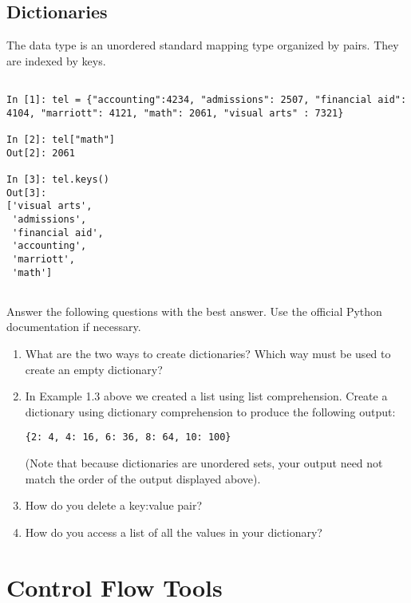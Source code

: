 \subsection*{Dictionaries}
\begin{example}

The  data type is an unordered standard mapping type 
organized by  pairs. They are indexed by keys. 

\begin{lstlisting}

In [1]: tel = {"accounting":4234, "admissions": 2507, "financial aid": 4104, "marriott": 4121, "math": 2061, "visual arts" : 7321} 

In [2]: tel["math"]
Out[2]: 2061

In [3]: tel.keys()
Out[3]: 
['visual arts',
 'admissions',
 'financial aid',
 'accounting',
 'marriott',
 'math']
 
\end{lstlisting}
\end{example}

\begin{problem}
Answer the following questions with the best answer. Use the official Python documentation if necessary.
\begin{enumerate}
\item What are the two ways to create dictionaries? Which way must be used to
create an empty dictionary?
\item In Example 1.3 above we created a list using list comprehension. Create a dictionary using dictionary comprehension to produce the following output:

\begin{lstlisting}
{2: 4, 4: 16, 6: 36, 8: 64, 10: 100}
\end{lstlisting}

(Note that because dictionaries are unordered sets, your output need not match the 
order of the output displayed above).
\item How do you delete a key:value pair?
\item How do you access a list of all the values in your dictionary? 

\end{enumerate}
\end{problem}


\section*{Control Flow Tools}

